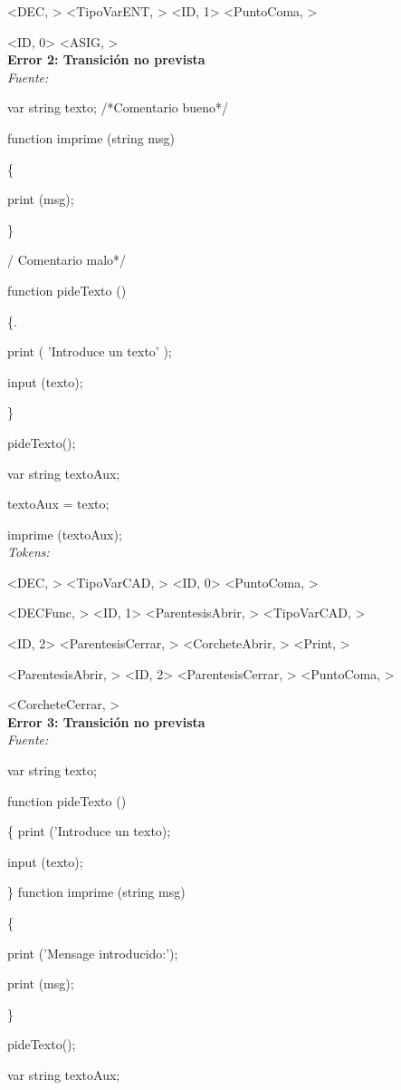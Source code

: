 \documentclass{article}
\begin{document}
 \< \> 
 <DEC, > 
 <TipoVarENT, > 
 <ID, 1> 
 <PuntoComa, > 
 
 \< \> 
 <ID, 0> 
 <ASIG, > \bigskip \\
\textbf{Error 2: Transición no prevista}\medskip\\
\emph{Fuente:} 


var string texto; /*Comentario bueno*/

 function imprime (string msg)
 
\{

	print (msg);
	
\} 

/ Comentario malo*/

function pideTexto () 

\{. 

	print ( 'Introduce un texto' ); 
	
	input (texto); 
	
\} 

 pideTexto(); 
 
var string textoAux;

textoAux = texto;

imprime (textoAux);\medskip\\
\emph{Tokens:} 


\< \> 
 <DEC, > 
 <TipoVarCAD, > 
 <ID, 0> 
 <PuntoComa, >
 
 \< \>
 <DECFunc, >  
 <ID, 1> 
 <ParentesisAbrir, > 
 <TipoVarCAD, >
 
 \< \>
 <ID, 2> 
 <ParentesisCerrar, > 
 <CorcheteAbrir, > 
 <Print, > 
 
 \< \>
 <ParentesisAbrir, > 
 <ID, 2> 
 <ParentesisCerrar, > 
 <PuntoComa, > 
 
 \< \>
 <CorcheteCerrar, >\bigskip \\
\textbf{Error 3: Transición no prevista}\medskip \\
\emph{Fuente:}

var string texto;

function pideTexto ()

\{
	print ('Introduce un texto);
	
	input (texto);
	
\}
function imprime (string msg)

\{

	print ('Mensage introducido:');
	
	print (msg);
	
\}

pideTexto();

var string textoAux;
\end{document}
